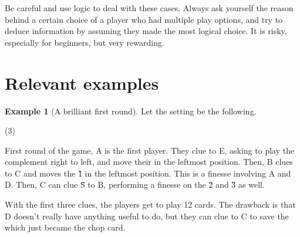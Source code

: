 \documentclass[a4paper]{article}
\theoremstyle{plain}
\theoremstyle{definition}
\newtheorem{example}[theorem]{Example}
\begin{document}
Be careful and use logic to deal with these cases. Always ask yourself the reason behind a certain choice of a player who had multiple play options, and try to deduce information by assuming they made the most logical choice. It is risky, especially for beginners, but very rewarding.

\section{Relevant examples}

\begin{example}[A brilliant first round]
	
	Let the setting be the following.
	
	\begin{tasks}(3)
		\task[+]      
		\task[A]    
		\task[B]    
		\task[C]    
		\task[D]    
		\task[E]    
	\end{tasks}
	
	First round of the game, A is the first player. They clue  to E, asking to play the complement right to left, and move their  in the leftmost position. Then, B clues  to C and moves the \G{1} in the leftmost position. This is a finesse involving A and D. Then, C can clue \G{S} to B, performing a finesse on the \G{2} and \G{3} as well.
	
	With the first three clues, the players get to play 12 cards. The drawback is that D doesn't really have anything useful to do, but they can clue  to C to save the  which just became the chop card.	
\end{example}
\end{document}

